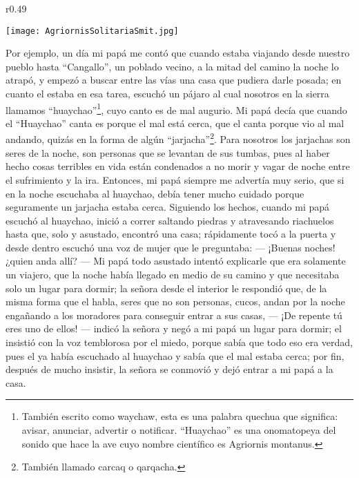 \begin{wrapfigure}{r}{0.49\textwidth}
  \begin{center}
  \vspace{-20pt}
    \texttt{[image: AgriornisSolitariaSmit.jpg]}
  \end{center}
  \vspace{-20pt}
\end{wrapfigure}
Por ejemplo, un día mi papá me contó que cuando estaba viajando desde nuestro pueblo hasta ``Cangallo'', un poblado vecino, a la mitad del camino la noche lo atrapó, y empezó a buscar entre las vías una casa que pudiera darle posada; en cuanto el estaba en esa tarea, escuchó un pájaro al cual nosotros en la sierra llamamos ``huaychao''\footnote{También escrito como waychaw, esta es una palabra quechua que significa: avisar, anunciar, advertir o notificar. ``Huaychao'' es una onomatopeya del sonido que hace la ave cuyo nombre científico es Agriornis montanus.}, cuyo canto es de mal augurio.
Mi papá decía que cuando el ``Huaychao'' canta es porque el mal está cerca, que el canta porque vio al mal andando, quizás en la forma de algún ``jarjacha''\footnote{También llamado carcaq o qarqacha.}. Para nosotros los jarjachas son seres de la noche, son personas que se levantan de sus tumbas, pues al haber hecho cosas terribles en vida están condenados a no morir y vagar de noche entre el sufrimiento y la ira.
Entonces, mi papá siempre me advertía muy serio, que si en la noche escuchaba al huaychao, debía tener mucho cuidado porque seguramente un jarjacha estaba cerca.
Siguiendo los hechos, cuando mi papá escuchó al huaychao, inició a correr saltando piedras y atravesando riachuelos hasta que, solo y asustado, encontró una casa; rápidamente tocó a la puerta y desde dentro escuchó una voz de mujer que le preguntaba: 
--- ¡Buenas noches! ¿quien anda allí? ---
Mi papá todo asustado intentó explicarle que era solamente un viajero, que la noche había llegado en medio de su camino y que necesitaba solo un lugar para dormir; la señora desde el interior le respondió que, de la misma forma que el habla, seres que no son personas, cucos, andan por la noche engañando a los moradores para conseguir entrar a sus casas, 
--- ¡De repente tú eres uno de ellos! --- indicó la señora y negó a mi papá un lugar para dormir; el insistió con la voz temblorosa por el miedo, porque sabía que todo eso era verdad, pues el ya había escuchado al huaychao y sabía que el mal estaba cerca; por fin, después de mucho insistir, la señora se conmovió y dejó entrar a mi papá a la casa.

